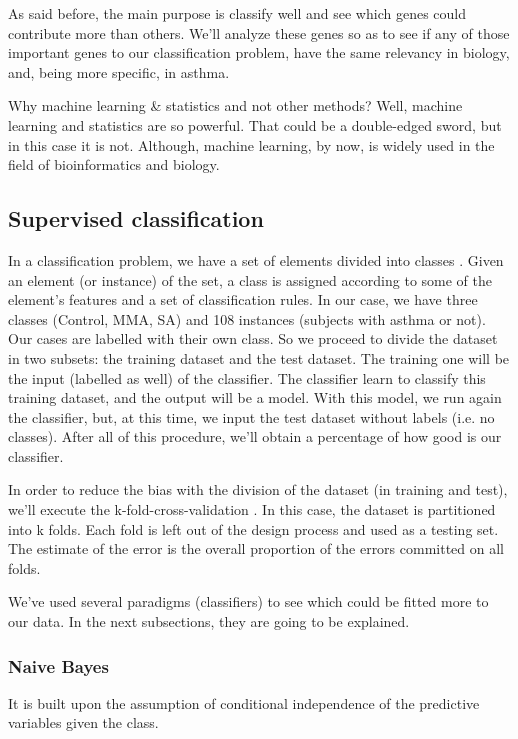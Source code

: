 \documentclass[conference,a4paper]{IEEEtran}
\begin{document}
As said before, the main purpose is classify well and see which genes could contribute more than others. We'll analyze these genes so as to see if any of those important genes to our classification problem, have the same relevancy in biology, and, being more specific, in asthma.

Why machine learning \& statistics and not other methods? Well, machine learning and statistics are so powerful. That could be a double-edged sword, but in this case it is not. Although, machine learning, by now, is widely used in the field of bioinformatics and biology.

\subsection{Supervised classification}

In a classification problem, we have a set of elements divided into classes \cite{machineBioinfo}. Given an element (or instance) of the set, a class is assigned according to some of the element's features and a set of classification rules. In our case, we have three classes (Control, MMA, SA) and 108 instances (subjects with asthma or not). Our cases are labelled with their own class. So we proceed to divide the dataset in two subsets: the training dataset and the test dataset. The training one will be the input (labelled as well) of the classifier. The classifier learn to classify this training dataset, and the output will be a model. With this model, we run again the classifier, but, at this time, we input the test dataset without labels (i.e. no classes). After all of this procedure, we'll obtain a percentage of how good is our classifier.

In order to reduce the bias with the division of the dataset (in training and test), we'll execute the k-fold-cross-validation \cite{CrossValidation}. In this case, the dataset is partitioned into k folds. Each fold is left out of the design process and used as a testing set. The estimate of the error is the overall proportion of the errors committed on all folds.

We've used several paradigms (classifiers) to see which could be fitted more to our data. In the next subsections, they are going to be explained.

\subsubsection{Naive Bayes}

It is built upon the assumption of conditional independence of the predictive variables given the class. 
\end{document}

